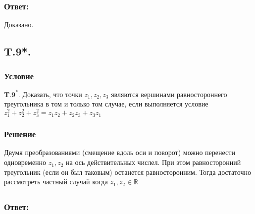 \documentclass{article}
\newcommand{\R}{\mathbb{R}}
\begin{document}
\subsubsection*{Ответ:}
Доказано.
\subsection{T.9*.}
\subsubsection*{Условие}
$\mathbf{T . 9}^{*} .$ Доказать, что точки $z_{1}, z_{2}, z_{3}$ являются вершинами равностороннего треугольника в том и только том случае, если выполняется условие $z_{1}^{2}+z_{2}^{2}+z_{3}^{2}=z_{1} z_{2}+z_{2} z_{3}+z_{3} z_{1}$
\subsubsection*{Решение} 
Двумя преобразованиями (смещение вдоль оси и поворот) можно перенести одновременно $z_1, z_2$ на ось действительных числел. При этом равносторонний треугольник (если он был таковым) останется равносторонним.  Тогда достаточно рассмотреть частный случай когда $z_1,z_2 \in \R $  
\begin{gather*}
                      
\end{gather*}                  
\subsubsection*{Ответ:}
\end{document}
